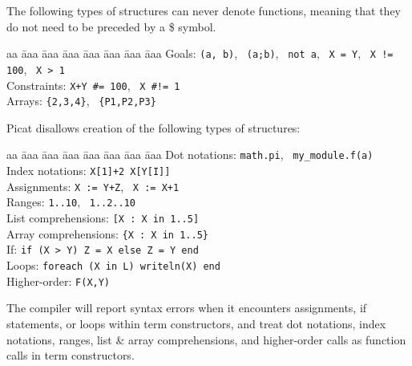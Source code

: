 The following types of structures can never denote functions, meaning that they do not need to be preceded by a \$ symbol.
\begin{tabbing}
aa \= aaa \= aaa \= aaa \=aaa \= aaa \= aaa \= aaa \kill
\> Goals:  \>  \> \> \> \> \> \texttt{(a, b)}, \ \texttt{(a;b)}, \ \texttt{not a}, \ \texttt{X = Y}, \ \verb-X != 100-, \ \verb+X > 1+ \\
\> Constraints:  \>  \> \> \> \> \> \verb-X+Y #= 100-, \ \verb+X #!= 1+ \\
\> Arrays:  \>  \> \> \> \> \> \verb+{2,3,4}+, \ \verb+{P1,P2,P3}+ \\
\end{tabbing}
Picat disallows creation of the following types of structures:
\begin{tabbing}
aa \= aaa \= aaa \= aaa \= aaa \= aaa \= aaa \= aaa \kill
\> Dot notations:  \>  \> \> \> \> \> \texttt{math.pi}, \ \texttt{my\_module.f(a)} \\
\> Index notations:  \>  \> \> \> \> \> \texttt{X[1]+2}\, \texttt{X[Y[I]]} \\
\> Assignments:  \>  \> \> \> \> \> \texttt{X := Y+Z}, \ \texttt{X := X+1} \\
\> Ranges:  \>  \> \> \> \> \> \texttt{1..10}, \ \texttt{1..2..10} \\
\> List comprehensions:  \>  \> \> \> \> \> \texttt{[X : X in 1..5]} \\
\> Array comprehensions:  \>  \> \> \> \> \> \texttt{\{X : X in 1..5\}} \\
\> If:  \>  \> \> \> \> \> \texttt{if (X > Y) Z = X else Z = Y end} \\
\> Loops:  \>  \> \> \> \> \> \texttt{foreach (X in L) writeln(X) end } \\
\> Higher-order:  \>  \> \> \> \> \> \texttt{F(X,Y)} 
\end{tabbing}
The compiler will report syntax errors when it encounters assignments, if statements, or loops within term constructors, and treat dot notations, index notations, ranges, list \& array comprehensions, and higher-order calls as function calls in term constructors.

